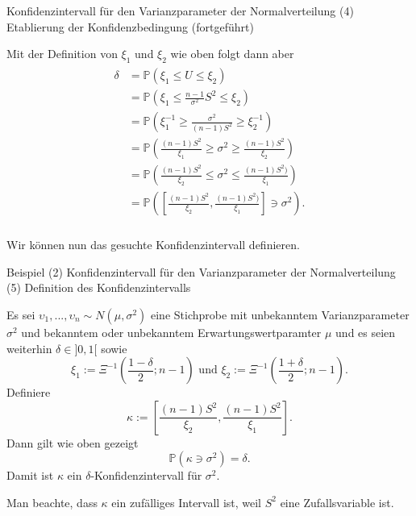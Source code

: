 \documentclass[
  8pt,
  ignorenonframetext,
]{beamer}
\newcommand{\ups} {\upsilon}
\begin{document}
\begin{frame}{Konfidenzintervall für den Varianzparameter der
Normalverteilung}
\protect\hypertarget{konfidenzintervall-fuxfcr-den-varianzparameter-der-normalverteilung-4}{}
\noindent (4) Etablierung der Konfidenzbedingung (fortgeführt)

\small

Mit der Definition von \(\xi_1\) und \(\xi_2\) wie oben folgt dann aber
\footnotesize \begin{align}
\begin{split}
\delta
& = \mathbb{P}\left(\xi_1 \le U \le \xi_2 \right)                                                           \\
& = \mathbb{P}\left(\xi_1 \le \frac{n-1}{\sigma^2}S^2  \le \xi_2 \right)                                    \\
& = \mathbb{P}\left(\xi_1^{-1} \ge \frac{\sigma^2}{(n-1)S^2} \ge \xi_2^{-1} \right)                         \\
& = \mathbb{P}\left(\frac{(n-1)S^2}{\xi_1} \ge \sigma^2 \ge \frac{(n-1)S^2}{\xi_2} \right)              \\
& = \mathbb{P}\left(\frac{(n-1)S^2}{\xi_2} \le \sigma^2 \le \frac{(n-1)S^2)}{\xi_1} \right)             \\
& = \mathbb{P}\left(\left[\frac{(n-1)S^2}{\xi_2}, \frac{(n-1)S^2)}{\xi_1}\right] \ni \sigma^2 \right).  \\
\end{split}
\end{align}

\small

Wir können nun das gesuchte Konfidenzintervall definieren.
\end{frame}

\begin{frame}{\small Beispiel (2) Konfidenzintervall für den
Varianzparameter der Normalverteilung}
\protect\hypertarget{beispiel-2-konfidenzintervall-fuxfcr-den-varianzparameter-der-normalverteilung}{}
\noindent(5) Definition des Konfidenzintervalls \small

Es sei \(\ups_1,...,\ups_n \sim N(\mu,\sigma^2)\) eine Stichprobe mit
unbekanntem Varianzparameter \(\sigma^2\) und bekanntem oder unbekanntem
Erwartungswertparamter \(\mu\) und es seien weiterhin
\(\delta \in ]0,1[\) sowie \begin{equation}
\xi_1 := \Xi^{-1}\left(\frac{1 - \delta}{2};n-1 \right) \mbox{ und }
\xi_2 := \Xi^{-1}\left(\frac{1 + \delta}{2};n-1 \right). 
\end{equation} Definiere \begin{equation}
\kappa := \left[\frac{(n-1)S^2}{\xi_2}, \frac{(n-1)S^2}{\xi_1}\right].
\end{equation} Dann gilt wie oben gezeigt \begin{equation}
\mathbb{P}(\kappa \ni \sigma^2) = \delta.
\end{equation} Damit ist \(\kappa\) ein \(\delta\)-Konfidenzintervall
für \(\sigma^2\).

Man beachte, dass \(\kappa\) ein zufälliges Intervall ist, weil \(S^2\)
eine Zufallsvariable ist.
\end{frame}
\end{document}
